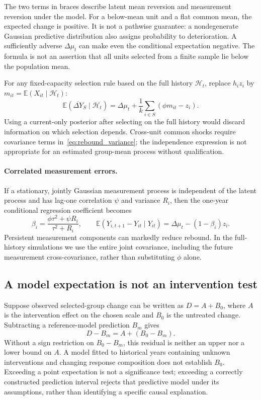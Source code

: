 \documentclass[11pt,letterpaper]{article}
\newcommand{\E}{\mathbb E}
\begin{document}
The two terms in braces describe latent mean reversion and measurement reversion under the model. For a below-mean unit and a flat common mean, the expected change is positive. It is not a pathwise guarantee: a nondegenerate Gaussian predictive distribution also assigns probability to deterioration. A sufficiently adverse $\Delta\mu_t$ can make even the conditional expectation negative. The formula is not an assertion that all units selected from a finite sample lie below the population mean.

For any fixed-capacity selection rule based on the full history $\mathcal H_t$, replace $h_i z_i$ by $m_{it}=\E(X_{it}\mid\mathcal H_t)$:
\begin{equation}
 \E(\overline{\Delta Y}_S\mid\mathcal H_t)
 =\Delta\mu_t+\frac1k\sum_{i\in S}(\phi m_{it}-z_i).
 \label{eq:history_rebound}
\end{equation}
Using a current-only posterior after selecting on the full history would discard information on which selection depends. Cross-unit common shocks require covariance terms in~\eqref{eq:rebound_variance}; the independence expression is not appropriate for an estimated group-mean process without qualification.

\paragraph{Correlated measurement errors.}
If a stationary, jointly Gaussian measurement process is independent of the latent process and has lag-one correlation $\psi$ and variance $R_i$, then the one-year conditional regression coefficient becomes
\begin{equation}
 \beta_i=\frac{\phi\tau^2+\psi R_i}{\tau^2+R_i},\qquad
 \E(Y_{i,t+1}-Y_{it}\mid Y_{it})=\Delta\mu_t-(1-\beta_i)z_i.
 \label{eq:correlated_rebound}
\end{equation}
Persistent measurement components can markedly reduce rebound. In the full-history simulations we use the entire joint covariance, including the future measurement cross-covariance, rather than substituting $\phi$ alone.

\subsection{A model expectation is not an intervention test}
Suppose observed selected-group change can be written as $D=A+B_0$, where $A$ is the intervention effect on the chosen scale and $B_0$ is the untreated change. Subtracting a reference-model prediction $B_m$ gives
\begin{equation}
 D-B_m=A+(B_0-B_m).
 \label{eq:causal_residual}
\end{equation}
Without a sign restriction on $B_0-B_m$, this residual is neither an upper nor a lower bound on $A$. A model fitted to historical years containing unknown interventions and changing response composition does not establish $B_0$. Exceeding a point expectation is not a significance test; exceeding a correctly constructed prediction interval rejects that predictive model under its assumptions, rather than identifying a specific causal explanation.
\end{document}
